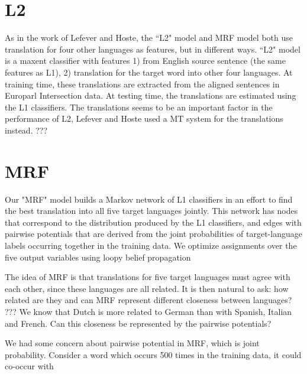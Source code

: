 \documentclass[11pt,letterpaper]{article}
\begin{document}
\section{L2}
As in the work of Lefever and Hoste, the ``L2" model and MRF model both use translation for four other languages as features, but in different ways.
``L2" model is a maxent classifier with features 1) from English source sentence (the same features as L1), 2) translation for the target word into other four languages. 
At training time, these translations are extracted from the aligned sentences in Europarl Intersection data. 
At testing time, the translations are estimated using the L1 classifiers. 
The translations seems to be an important factor in the performance of L2, Lefever and Hoste used a MT system for the translations instead.
???



\section{MRF}
Our "MRF" model builds a Markov network of L1 classifiers in an effort to find
the best translation into all five target languages jointly. This network has
nodes that correspond to the distribution produced by the L1 classifiers, and
edges with pairwise potentials that are derived from the joint probabilities of
target-language labels occurring together in the training data. We optimize
assignments over the five output variables using loopy belief propagation

The idea of MRF is that translations for five target languages must agree with each other, since these languages are all related.
It is then natural to ask: how related are they and can MRF represent different closeness between languages?
???
We know that Dutch is more related to German than with Spanish, Italian and French. Can this closeness be represented by the pairwise potentials?

We had some concern about pairwise potential in MRF, which is joint probability. Consider a word which occurs 500 times in the training data, it could co-occur with
\end{document}
